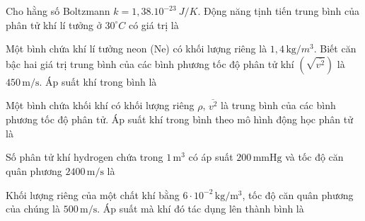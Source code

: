 \begin{ex}
Cho hằng số Boltzmann $k=1,38.10^{-23}\ J/K$. Động năng tịnh tiến trung bình của phân tử khí lí tưởng ở $30^\circ C$ có giá trị là
\end{ex}

\begin{ex}
Một bình chứa khí lí tưởng neon (Ne) có khối lượng riêng là $1,4\,\text{kg}/m^3$. Biết căn bậc hai giá trị trung bình của các bình phương tốc độ phân tử khí $\left(\sqrt{\overline{v^2}}\right)$ là $450\,\text{m/s}$. Áp suất khí trong bình là
\end{ex}

\begin{ex}
Một bình chứa khối khí có khối lượng riêng $\rho$, $\overline{v^2}$ là trung bình của các bình phương tốc độ phân tử. Áp suất khí trong bình theo mô hình động học phân tử là
\end{ex}

\begin{ex}
Số phân tử khí hydrogen chứa trong $1\,\mathrm{m^3}$ có áp suất $200\,\mathrm{mmHg}$ và tốc độ căn quân phương $2400\,\mathrm{m/s}$ là
\end{ex}

\begin{ex}
Khối lượng riêng của một chất khí bằng $6\cdot 10^{-2}\,\mathrm{kg/m^3}$, tốc độ căn quân phương của chúng là $500\,\mathrm{m/s}$. Áp suất mà khí đó tác dụng lên thành bình là
\end{ex}

